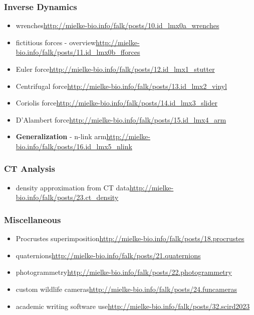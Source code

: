 \begin{change}
\subsubsection{Inverse Dynamics}
\label{sec:org99043cc}
\begin{itemize}
\item wrenches\newline \url{http://mielke-bio.info/falk/posts/10.id\_lmx0a\_wrenches}
\item fictitious forces - overview\newline \url{http://mielke-bio.info/falk/posts/11.id\_lmx0b\_fforces}
\item Euler force\newline \url{http://mielke-bio.info/falk/posts/12.id\_lmx1\_stutter}
\item Centrifugal force\newline \url{http://mielke-bio.info/falk/posts/13.id\_lmx2\_vinyl}
\item Coriolis force\newline \url{http://mielke-bio.info/falk/posts/14.id\_lmx3\_slider}
\item D'Alambert force\newline \url{http://mielke-bio.info/falk/posts/15.id\_lmx4\_arm}
\item \textbf{Generalization} - n-link arm\newline \url{http://mielke-bio.info/falk/posts/16.id\_lmx5\_nlink}
\end{itemize}
\subsubsection{CT Analysis}
\label{sec:org7f07fb1}
\begin{itemize}
\item density approximation from CT data\newline \url{http://mielke-bio.info/falk/posts/23.ct\_density}
\end{itemize}
\subsubsection{Miscellaneous}
\label{sec:org0caaa21}
\begin{itemize}
\item Procrustes superimposition\newline \url{http://mielke-bio.info/falk/posts/18.procrustes}
\item quaternions\newline \url{http://mielke-bio.info/falk/posts/21.quaternions}
\item photogrammetry\newline \url{http://mielke-bio.info/falk/posts/22.photogrammetry}
\item custom wildlife cameras\newline \url{http://mielke-bio.info/falk/posts/24.funcameras}
\item academic writing software use\newline \url{http://mielke-bio.info/falk/posts/32.scird2023}
\end{itemize}

\end{change}

